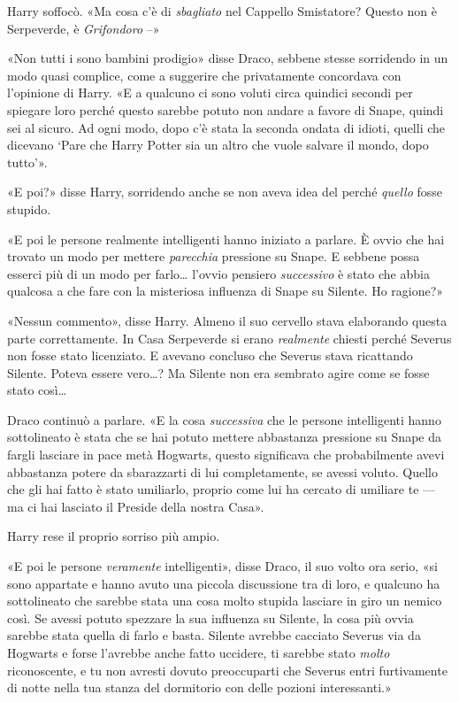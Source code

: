 Harry soffocò. «Ma cosa c’è di \textit{sbagliato} nel Cappello Smistatore? Questo non è Serpeverde, è \textit{Grifondoro} –»

«Non tutti i sono bambini prodigio» disse Draco, sebbene stesse sorridendo in un modo quasi complice, come a suggerire che privatamente concordava con l’opinione di Harry. «E a qualcuno ci sono voluti circa quindici secondi per spiegare loro perché questo sarebbe potuto non andare a favore di Snape, quindi sei al sicuro. Ad ogni modo, dopo c’è stata la seconda ondata di idioti, quelli che dicevano ‘Pare che Harry Potter sia un altro che vuole salvare il mondo, dopo tutto’».

«E poi?» disse Harry, sorridendo anche se non aveva idea del perché \textit{quello} fosse stupido.

«E poi le persone realmente intelligenti hanno iniziato a parlare. È ovvio che hai trovato un modo per mettere \textit{parecchia} pressione su Snape. E sebbene possa esserci più di un modo per farlo… l’ovvio pensiero \textit{successivo} è stato che abbia qualcosa a che fare con la misteriosa influenza di Snape su Silente. Ho ragione?»

«Nessun commento», disse Harry. Almeno il suo cervello stava elaborando questa parte correttamente. In Casa Serpeverde si erano \textit{realmente} chiesti perché Severus non fosse stato licenziato. E avevano concluso che Severus stava ricattando Silente. Poteva essere vero…? Ma Silente non era sembrato agire come se fosse stato così…

Draco continuò a parlare. «E la cosa \textit{successiva} che le persone intelligenti hanno sottolineato è stata che se hai potuto mettere abbastanza pressione su Snape da fargli lasciare in pace metà Hogwarts, questo significava che probabilmente avevi abbastanza potere da sbarazzarti di lui completamente, se avessi voluto. Quello che gli hai fatto è stato umiliarlo, proprio come lui ha cercato di umiliare te — ma ci hai lasciato il Preside della nostra Casa».

Harry rese il proprio sorriso più ampio.

«E poi le persone \textit{veramente} intelligenti», disse Draco, il suo volto ora serio, «si sono appartate e hanno avuto una piccola discussione tra di loro, e qualcuno ha sottolineato che sarebbe stata una cosa molto stupida lasciare in giro un nemico così. Se avessi potuto spezzare la sua influenza su Silente, la cosa più ovvia sarebbe stata quella di farlo e basta. Silente avrebbe cacciato Severus via da Hogwarts e forse l’avrebbe anche fatto uccidere, ti sarebbe stato \textit{molto} riconoscente, e tu non avresti dovuto preoccuparti che Severus entri furtivamente di notte nella tua stanza del dormitorio con delle pozioni interessanti.»

